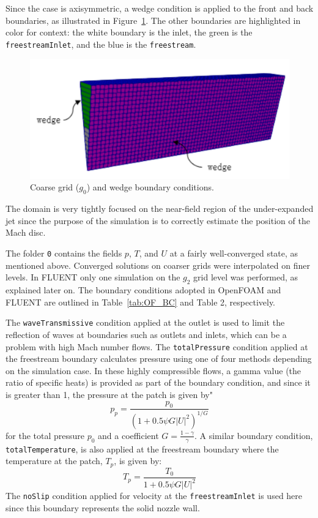 \documentclass[12pt]{article}
\begin{document}
Since the case is axisymmetric, a wedge condition is applied to the front and back boundaries, as illustrated in Figure~\ref{fig:wedge}. The other boundaries are highlighted in color for context: the white boundary is the inlet, the green is the \texttt{freestreamInlet}, and the blue is the \texttt{freestream}.

\begin{figure}[H]
  \centering
  \includegraphics[width=\textwidth]{figs/wedge.png}
  \caption{Coarse grid ($g_0$) and wedge boundary conditions.}
  \label{fig:wedge}
\end{figure}

The domain is very tightly focused on the near-field region of the under-expanded jet since the purpose of the simulation is to correctly estimate the position of the Mach disc.

The folder \texttt{0} contains the fields $p$, $T$, and $U$ at a fairly well-converged state, as mentioned above. Converged solutions on coarser grids were interpolated on finer levels. In FLUENT only one simulation on the $g_2$ grid level was performed, as explained later on. The boundary conditions adopted in OpenFOAM and FLUENT are outlined in Table~\ref{tab:OF_BC} and Table 2, respectively.

The \texttt{waveTransmissive} condition applied at the outlet is used to limit the reflection of waves at boundaries such as outlets and inlets, which can be a problem with high Mach number flows. The \texttt{totalPressure} condition applied at the freestream boundary calculates pressure using one of four methods depending on the simulation case. In these highly compressible flows, a gamma value (the ratio of specific heats) is provided as part of the boundary condition, and since it is greater than 1, the pressure at the patch is given by"
%
\begin{equation}
  p_p = \frac{p_0}{(1 + 0.5 \psi G |U|^2)^{1/G}}
  \label{eq:total_pressure}
\end{equation}
%
for the total pressure $p_0$ and a coefficient $G = \frac{1 - \gamma}{\gamma}$. A similar boundary condition, \texttt{totalTemperature}, is also applied at the freestream boundary where the temperature at the patch, $T_p$, is given by:
%
\begin{equation}
  T_p = \frac{T_0}{1 + 0.5 \psi G |U|^2}
  \label{eq:total.temperature}
\end{equation}
%
The \texttt{noSlip} condition applied for velocity at the \texttt{freestreamInlet} is used here since this boundary represents the solid nozzle wall.
\end{document}
